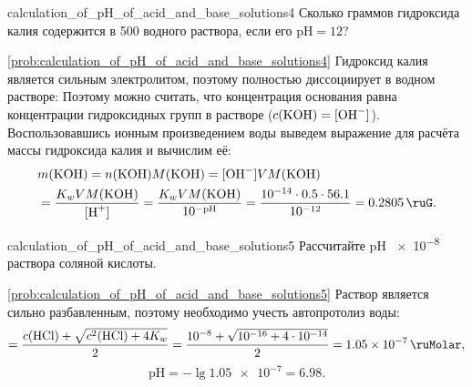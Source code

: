 \begin{problem}{}{calculation_of_pH_of_acid_and_base_solutions4}
    Сколько граммов гидроксида калия содержится в \qty{500}{\ruMl} водного раствора, если его $\text{pH} = 12$?
    \begin{sol}{\ref{prob:calculation_of_pH_of_acid_and_base_solutions4}}
        Гидроксид калия является сильным электролитом, поэтому полностью диссоциирует в водном растворе:
        Поэтому можно считать, что концентрация основания равна концентрации гидроксидных групп в растворе ($c(\ce{KOH}) = [\ce{OH^-}]$). Воспользовавшись ионным произведением воды выведем выражение для расчёта массы гидроксида калия и вычислим её:
        \begin{align*}
            &m(\ce{KOH}) = n(\ce{KOH})M(\ce{KOH}) = [\ce{OH^-}]VM(\ce{KOH}) \\
            &= \frac{K_wVM(\ce{KOH})}{[\ce{H+}]} = \frac{K_wVM(\ce{KOH})}{10^{-\text{pH}}} = \frac{\num{e-14}\cdot\num{0,5}\cdot\num{56,1}}{\num{e-12}} = \qty{0,2805}{\ruG}.
        \end{align*}
    \end{sol}
\end{problem}

\begin{problem}{}{calculation_of_pH_of_acid_and_base_solutions5}
    Рассчитайте pH \qty{e-8}{\ruMolar} раствора соляной кислоты.
    \begin{sol}{\ref{prob:calculation_of_pH_of_acid_and_base_solutions5}}
        Раствор является сильно разбавленным, поэтому необходимо учесть автопротолиз воды:
        \begin{equation*}
            [\ce{H^+}] = \frac{c(\ce{HCl}) + \sqrt{c^2(\ce{HCl}) + 4K_w}}{2} = \frac{\num{e-8} + \sqrt{\num{e-16} + 4\cdot\num{e-14}}}{2} = \qty{1,05e-7}{\ruMolar},
        \end{equation*}
        \begin{equation*}
            \text{pH} = -\lg\num{1,05e-7} = \num{6,98}.
        \end{equation*}
    \end{sol}
\end{problem}

